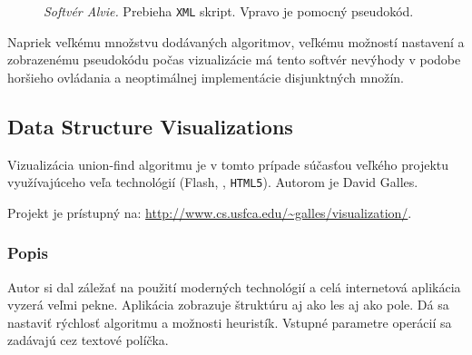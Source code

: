 \begin{figure}
\centering
{}
\caption{\emph{Softvér Alvie.} Prebieha {\tt XML} skript. Vpravo je pomocný 
pseudokód.}
\label{img:vis:alvie}
\end{figure}

Napriek veľkému množstvu dodávaných algoritmov, veľkému možností nastavení a 
zobrazenému pseudokódu počas vizualizácie má tento softvér nevýhody v podobe 
horšieho ovládania a neoptimálnej implementácie disjunktných množín.

\subsection{Data Structure Visualizations}\label{sec:galles}

Vizualizácia union-find algoritmu je v tomto prípade súčasťou veľkého projektu 
využívajúceho veľa technológií (Flash, \Java, {\tt HTML5}). Autorom je David 
Galles.

Projekt je prístupný na: 
\hbox{\url{http://www.cs.usfca.edu/~galles/visualization/}}.

\subsubsection{Popis}

Autor si dal záležať na použití moderných technológií a celá internetová 
aplikácia vyzerá veľmi pekne. Aplikácia zobrazuje štruktúru aj ako les aj ako 
pole. Dá sa nastaviť rýchlosť algoritmu a možnosti heuristík. Vstupné 
parametre operácií sa zadávajú cez textové políčka.

